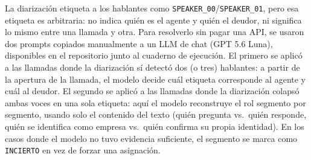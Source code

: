 \documentclass[10pt,a4paper]{article}
\begin{document}
La diarización etiqueta a los hablantes como \texttt{SPEAKER\_00}/\texttt{SPEAKER\_01}, pero
esa etiqueta es arbitraria: no indica quién es el agente y quién el deudor, ni significa lo
mismo entre una llamada y otra. Para resolverlo sin pagar una API, se usaron dos prompts
copiados manualmente a un LLM de chat (GPT 5.6 Luna), disponibles en el
repositorio junto al cuaderno de ejecución. El primero se aplicó a las llamadas donde la
diarización sí detectó dos (o tres) hablantes: a partir de la apertura de la llamada, el
modelo decide cuál etiqueta corresponde al agente y cuál al deudor. El segundo se aplicó a
las llamadas donde la diarización colapsó ambas voces en una sola etiqueta: aquí el modelo
reconstruye el rol segmento por segmento, usando solo el contenido del texto
(quién pregunta vs.\ quién responde, quién se identifica como empresa vs.\ quién confirma su
propia identidad). En los casos donde el modelo no tuvo evidencia suficiente, el segmento
se marca como \texttt{INCIERTO} en vez de forzar una asignación.
\end{document}
